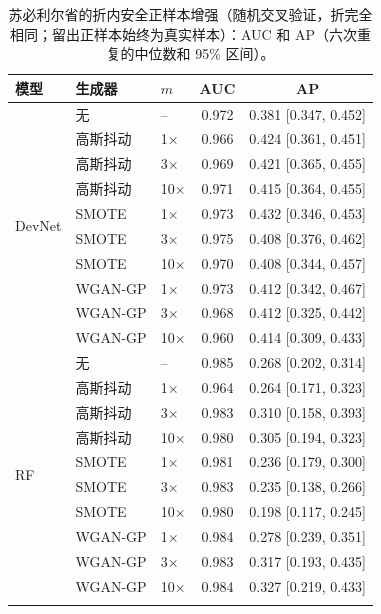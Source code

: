 \documentclass[pdflatex,sn-apa]{sn-jnl}
\begin{document}
\begin{table}[t]
\caption{苏必利尔省的折内安全正样本增强（随机交叉验证，折完全相同；留出正样本始终为真实样本）：AUC 和 AP（六次重复的中位数和 95\% 区间）。}\label{tab:augmentation}
\footnotesize
\begin{tabular*}{0.8\textwidth}{@{\extracolsep\fill}lllcc}
\toprule
模型 & 生成器 & $m$ & AUC & AP \\
\midrule
\multirow{10}{*}{DevNet} & 无 & -- & 0.972 & 0.381 [0.347, 0.452] \\
 & 高斯抖动 & 1$\times$ & 0.966 & 0.424 [0.361, 0.451] \\
 & 高斯抖动 & 3$\times$ & 0.969 & 0.421 [0.365, 0.455] \\
 & 高斯抖动 & 10$\times$ & 0.971 & 0.415 [0.364, 0.455] \\
 & SMOTE & 1$\times$ & 0.973 & 0.432 [0.346, 0.453] \\
 & SMOTE & 3$\times$ & 0.975 & 0.408 [0.376, 0.462] \\
 & SMOTE & 10$\times$ & 0.970 & 0.408 [0.344, 0.457] \\
 & WGAN-GP & 1$\times$ & 0.973 & 0.412 [0.342, 0.467] \\
 & WGAN-GP & 3$\times$ & 0.968 & 0.412 [0.325, 0.442] \\
 & WGAN-GP & 10$\times$ & 0.960 & 0.414 [0.309, 0.433] \\
\midrule
\multirow{10}{*}{RF} & 无 & -- & 0.985 & 0.268 [0.202, 0.314] \\
 & 高斯抖动 & 1$\times$ & 0.964 & 0.264 [0.171, 0.323] \\
 & 高斯抖动 & 3$\times$ & 0.983 & 0.310 [0.158, 0.393] \\
 & 高斯抖动 & 10$\times$ & 0.980 & 0.305 [0.194, 0.323] \\
 & SMOTE & 1$\times$ & 0.981 & 0.236 [0.179, 0.300] \\
 & SMOTE & 3$\times$ & 0.983 & 0.235 [0.138, 0.266] \\
 & SMOTE & 10$\times$ & 0.980 & 0.198 [0.117, 0.245] \\
 & WGAN-GP & 1$\times$ & 0.984 & 0.278 [0.239, 0.351] \\
 & WGAN-GP & 3$\times$ & 0.983 & 0.317 [0.193, 0.435] \\
 & WGAN-GP & 10$\times$ & 0.984 & 0.327 [0.219, 0.433] \\
\botrule
\end{tabular*}
\end{table}
\end{document}
